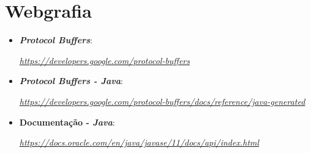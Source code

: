 \documentclass[a4paper]{report}
\begin{document}
\chapter{Webgrafia}
	\begin{itemize}
		\item \textbf{\textit{Protocol Buffers}}:
		\par \textit{\url{https://developers.google.com/protocol-buffers}}
        \item \textbf{\textit{Protocol Buffers - Java}}:
		\par \textit{\url{https://developers.google.com/protocol-buffers/docs/reference/java-generated}}
		\item \textbf{Documentação - \textit{Java}}:
		\par \textit{\url{https://docs.oracle.com/en/java/javase/11/docs/api/index.html}}
    \end{itemize}
\end{document}
